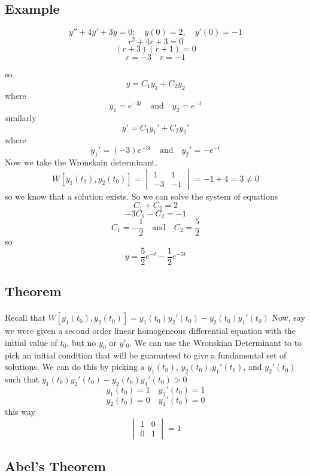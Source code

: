 \documentclass[font =22]{report}
\begin{document}
 \subsection*{Example}
 \[
 y'' + 4y' +3y = 0;\quad
 y(0) = 2, \quad y'(0) = -1
 \] 
 \[
 r^2 + 4r+3 = 0 
 \]
\[
(r+3)(r+1) = 0
\]
\[
r = -3\quad r = -1
\]

so
\[
y = C_1y_1 + C_2y_2
\]
where 
\[
y_1 =  e^{-3t}\quad\text{and}\quad y_2 = e^{-t}
\]
similarly 
\[
y' = C_1y_1' + C_2y_2'
\]
where 
\[
y_1' = (-3) e^{-3t}\quad\text{and}\quad
y_2' = -e^{-t}
\]
Now we take the Wronskain determinant.
\[
W[y_1(t_0),y_2(t_0)] = 
\begin{vmatrix}
1&1\\
-3&-1
\end{vmatrix}
= -1+4 = 3 \neq 0 
\]
so we know that a solution exists. So we can solve the system of equations 
\[
C_1 + C_2 = 2
\]
\[
-3C_1 - C_2 = -1
\]
\[
C_1 = -\frac{1}{2}\quad\text{and}\quad C_2 = \frac{5}{2}
\]
so 
\[
y = \frac{5}{2}e^{-t} - \frac{1}{2}e^{-3t}
\]
\subsection*{Theorem}
\paragraph{}
Recall that $W[y_1(t_0),y_2(t_0)] = y_1(t_0)y_2'(t_0)-y_2(t_0)y_1'(t_0) $
Now, say we were given a second order linear homogeneous differential equation with the initial value of $t_0$, but no $y_0$ or $y'_0$. We can use the Wronskian Determinant to to pick an initial condition that will be guaranteed to give a fundamental set of solutions. We can do this by picking a $y_1(t_0)$, $y_2(t_0)$,$y_1'(t_0)$, and $y_2'(t_0)$ such that $y_1(t_0)y_2'(t_0)-y_2(t_0)y_1'(t_0) > 0 $
\[
y_1(t_0) = 1 \quad y_2'(t_0) = 1
\]
\[
y_2(t_0) = 0 \quad y_1'(t_0) = 0
\]
this way 
\[
\begin{vmatrix}
1 & 0 \\
0 & 1
\end{vmatrix}
= 1
\]
\subsection{Abel's Theorem}
\end{document}
